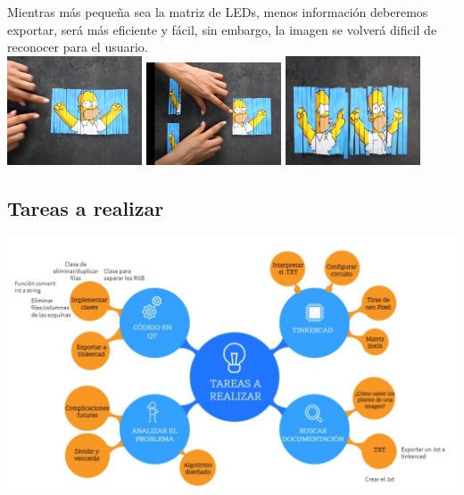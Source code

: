 \documentclass{article}
\begin{document}
Mientras más pequeña sea la matriz de LEDs, menos información deberemos exportar, será más eficiente y fácil, sin embargo, la imagen se volverá dificil de reconocer para el usuario.\\

\includegraphics[width=4cm]{Imagenes/recorte1.jpeg}
\includegraphics[width=4cm]{Imagenes/recorte2.jpeg}
\includegraphics[width=4cm]{Imagenes/recorte3.jpeg}
\vspace{0,3cm}

\subsection{Tareas a realizar}
\includegraphics[width=15cm]{Imagenes/Esquema.jpeg}
\end{document}
